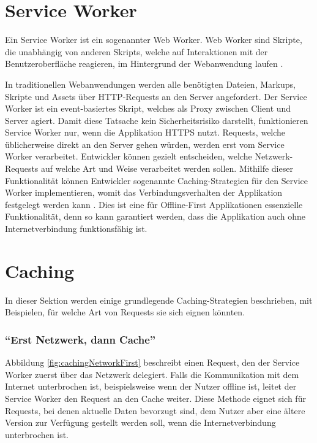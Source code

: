\documentclass[a4paper, 12pt]{scrreprt}
\begin{document}
\section{Service Worker}
\label{sec:serviceworker}

Ein Service Worker ist ein sogenannter Web Worker. Web Worker sind Skripte, die unabhängig von anderen Skripts, welche auf Interaktionen mit der Benutzeroberfläche reagieren, im Hintergrund der Webanwendung laufen \autocite{OnlineHTTPWorker}.

In traditionellen Webanwendungen werden alle benötigten Dateien, Markups, Skripte und Assets über \ac{HTTP}-Requests an den Server angefordert. Der Service Worker ist ein event-basiertes Skript, welches als Proxy zwischen Client und Server agiert. Damit diese Tatsache kein Sicherheitsrisiko darstellt, funktionieren Service Worker nur, wenn die Applikation \ac{HTTPS} nutzt. Requests, welche üblicherweise direkt an den Server gehen würden, werden erst vom Service Worker verarbeitet. Entwickler können gezielt entscheiden, welche Netzwerk-Requests auf welche Art und Weise verarbeitet werden sollen. Mithilfe dieser Funktionalität können Entwickler sogenannte Caching-Strategien für den Service Worker implementieren, womit das Verbindungsverhalten der Applikation festgelegt werden kann \autocite{OnlineServiceWorkersAnIntroduction}. Dies ist eine für Offline-First Applikationen essenzielle Funktionalität, denn so kann garantiert werden, dass die Applikation auch ohne Internetverbindung funktionsfähig ist. 

\section{Caching}
In dieser Sektion werden einige grundlegende Caching-Strategien beschrieben, mit Beispielen, für welche Art von Requests sie sich eignen könnten.

\subsubsection{\enquote{Erst Netzwerk, dann Cache}}
Abbildung \ref{fig:cachingNetworkFirst} beschreibt einen Request, den der Service Worker zuerst über das Netzwerk delegiert. Falls die Kommunikation mit dem Internet unterbrochen ist, beispielsweise wenn der Nutzer offline ist, leitet der Service Worker den Request an den Cache weiter. Diese Methode eignet sich für Requests, bei denen aktuelle Daten bevorzugt sind, dem Nutzer aber eine ältere Version zur Verfügung gestellt werden soll, wenn die Internetverbindung unterbrochen ist.
\end{document}
